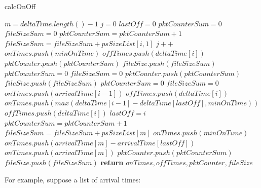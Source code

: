 \begin{algorithm}[pt!]
    \caption{calcOnOff}
    \label{alg:calcOnOff}
    \begin{algorithmic}[1]
        \small
        \State $m = deltaTime.length() - 1$
        \State $j = 0$
        \State $lastOff = 0$
        \State $pktCounterSum = 0$
        \State $fileSizeSum = 0$
        \State $pktCounterSum = pktCounterSum + 1$
        \State $fileSizeSum = fileSizeSum + psSizeList[i, 1]$
         
        \State $j++$
        \State $onTimes.push(minOnTime)$
        \State $offTimes.push(deltaTime[i])$
        \State $pktCounter.push(pktCounterSum)$
        \State $fileSize.push(fileSizeSum)$
        \State $pktCounterSum = 0$
        \State $fileSizeSum = 0$
        \Else {} 
        \State $pktCounter.push(pktCounterSum)$
        \State $fileSize.push(fileSizeSum)$
        \State $pktCounterSum = 0$
        \State $fileSizeSum = 0$
        \State $onTimes.push(arrivalTime[i - 1])$
        \State $offTimes.push(deltaTime[i])$
        \Else {} 
        \State  $onTimes.push(max(deltaTime[i-1] - deltaTime[lastOff], minOnTime))$ 
        \State  $offTimes.push(deltaTime[i])$
        \EndIf
        \State $lastOff = i$
        \EndIf 
        \EndIf       
        \EndFor
        \State $pktCounterSum = pktCounterSum + 1$
        \State $fileSizeSum = fileSizeSum + psSizeList[m]$
         
        \State $onTimes.push(minOnTime)$ %
        \Else {}
        \State $onTimes.push(arrivalTime[m] - arrivalTime[lastOff])$ 
        \Else 
        \State $onTimes.push(arrivalTime[m])$ 
        \EndIf
        \EndIf
        \State $pktCounter.push(pktCounterSum)$
        \State $fileSize.push(fileSizeSum)$
        \State \textbf{return} $onTimes, offTimes, pktCounter, fileSize$
        \EndFunction
    \end{algorithmic}
\end{algorithm}


For example, suppose a list of arrival times: 


